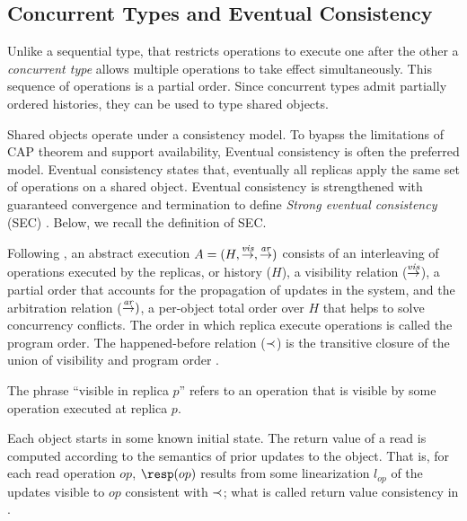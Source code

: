 

\subsection{Concurrent Types and Eventual Consistency}
Unlike a sequential type, that restricts operations to execute one after the other a \emph{concurrent type} allows multiple operations to take effect simultaneously. 
This sequence of operations is a partial order. 
Since concurrent types admit partially ordered histories, they can be used to type shared objects. 

Shared objects operate under a consistency model. 
To byapss the limitations of CAP theorem and support availability, Eventual consistency is often the preferred model. 
Eventual consistency states that, eventually all replicas apply the same set of operations on a shared object.
Eventual consistency is strengthened with guaranteed convergence and termination to define \emph{Strong eventual consistency} (SEC) \cite{ShapiroPBZ11}.
Below, we recall the definition of SEC.

Following \citet{rep:1754}, an abstract execution $A=(H,\stackrel{\mathit{vis}}{\rightarrow},\stackrel{\mathit{ar}}{\rightarrow})$ consists of an interleaving of operations executed by the replicas, or history ($H$), a visibility relation ($\stackrel{\mathit{vis}}{\rightarrow}$), a partial order that accounts for the propagation of updates in the system, and the arbitration relation ($\stackrel{\mathit{ar}}{\rightarrow})$, a per-object total order over $H$ that helps to solve concurrency conflicts.
%
The order in which replica execute operations is called the program order.
The happened-before relation ($\prec$) is the transitive closure of the union of visibility and program order \cite{rep:1754}.

The phrase ``visible in replica $p$'' refers to an operation that is visible by some operation executed at replica $p$.

Each object starts in some known initial state.
The return value of a read is computed according to the semantics of prior updates to the object.
That is, for each read operation $op$, $\resp(op)$ results from some linearization $l_{op}$ of the updates visible to $op$ consistent with $\prec$;
what is called return value consistency in \cite{}.

